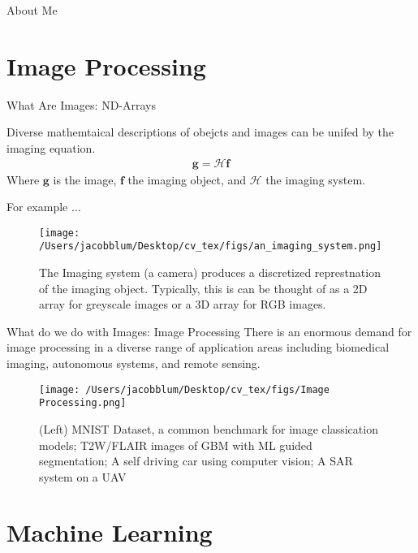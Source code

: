 \documentclass{beamer}
\begin{document}
\begin{frame}[plain]{About Me}
\begin{enumerate}
\begin{enumerate}
        
        \end{enumerate}
    \end{enumerate}
    
\end{frame}


\section{Image Processing}
\begin{frame}[plain]{What Are Images: ND-Arrays}
\begin{definition}
    Diverse mathemtaical descriptions of obejcts and images can be unifed by the imaging equation.
    \begin{align}
        \mathbf{g} = \boldsymbol{\mathcal{H}}\mathbf{f}
    \end{align}
    Where $\mathbf{g}$ is the image, $\mathbf{f}$ the imaging object, and $\mathcal{H}$ the imaging system.

    For example ...

    \begin{figure}
        \centering
            \texttt{[image: /Users/jacobblum/Desktop/cv\_tex/figs/an\_imaging\_system.png]}
            \caption{The Imaging system (a camera) produces a discretized represtnation of the imaging object. Typically, this is can be thought of as a 2D array for greyscale images or a 3D array for RGB images.}
        \end{figure}
    \end{definition}
\end{frame}

\begin{frame}[plain]{What do we do with Images: Image Processing}
    There is an enormous demand for image processing in a diverse range of application areas including biomedical imaging, autonomous systems, and remote sensing.
    \begin{figure}
        \centering
            \texttt{[image: /Users/jacobblum/Desktop/cv\_tex/figs/Image Processing.png]}
            \caption{(Left) MNIST Dataset, a common benchmark for image classication models; T2W/FLAIR images of GBM with ML guided segmentation; A self driving car using computer vision; A SAR system on a UAV}
        \end{figure}
\end{frame}

\section{Machine Learning}
\end{document}
